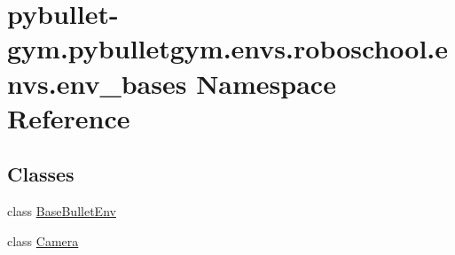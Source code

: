 \hypertarget{namespacepybullet-gym_1_1pybulletgym_1_1envs_1_1roboschool_1_1envs_1_1env__bases}{}\section{pybullet-\/gym.pybulletgym.\+envs.\+roboschool.\+envs.\+env\+\_\+bases Namespace Reference}
\label{namespacepybullet-gym_1_1pybulletgym_1_1envs_1_1roboschool_1_1envs_1_1env__bases}
\subsection*{Classes}
\begin{DoxyCompactItemize}
\item 
class \hyperlink{classpybullet-gym_1_1pybulletgym_1_1envs_1_1roboschool_1_1envs_1_1env__bases_1_1_base_bullet_env}{Base\+Bullet\+Env}
\item 
class \hyperlink{classpybullet-gym_1_1pybulletgym_1_1envs_1_1roboschool_1_1envs_1_1env__bases_1_1_camera}{Camera}
\end{DoxyCompactItemize}
